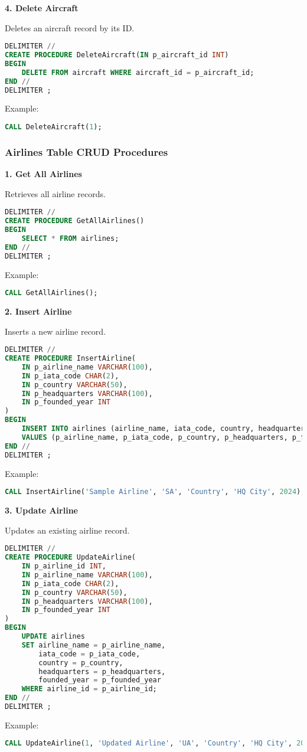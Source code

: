 \documentclass[a4paper,12pt]{article}
\begin{document}
\textbf{4. Delete Aircraft}

Deletes an aircraft record by its ID.
\begin{lstlisting}[language=SQL, caption=DeleteAircraft Stored Procedure]
DELIMITER //
CREATE PROCEDURE DeleteAircraft(IN p_aircraft_id INT)
BEGIN
    DELETE FROM aircraft WHERE aircraft_id = p_aircraft_id;
END //
DELIMITER ;
\end{lstlisting}
Example:
\begin{lstlisting}[language=SQL]
CALL DeleteAircraft(1);
\end{lstlisting}

\subsubsection{Airlines Table CRUD Procedures}
\textbf{1. Get All Airlines}

Retrieves all airline records.
\begin{lstlisting}[language=SQL, caption=GetAllAirlines Stored Procedure]
DELIMITER //
CREATE PROCEDURE GetAllAirlines()
BEGIN
    SELECT * FROM airlines;
END //
DELIMITER ;
\end{lstlisting}
Example:
\begin{lstlisting}[language=SQL]
CALL GetAllAirlines();
\end{lstlisting}

\textbf{2. Insert Airline}

Inserts a new airline record.
\begin{lstlisting}[language=SQL, caption=InsertAirline Stored Procedure]
DELIMITER //
CREATE PROCEDURE InsertAirline(
    IN p_airline_name VARCHAR(100),
    IN p_iata_code CHAR(2),
    IN p_country VARCHAR(50),
    IN p_headquarters VARCHAR(100),
    IN p_founded_year INT
)
BEGIN
    INSERT INTO airlines (airline_name, iata_code, country, headquarters, founded_year)
    VALUES (p_airline_name, p_iata_code, p_country, p_headquarters, p_founded_year);
END //
DELIMITER ;
\end{lstlisting}
Example:
\begin{lstlisting}[language=SQL]
CALL InsertAirline('Sample Airline', 'SA', 'Country', 'HQ City', 2024);
\end{lstlisting}

\textbf{3. Update Airline}

Updates an existing airline record.
\begin{lstlisting}[language=SQL, caption=UpdateAirline Stored Procedure]
DELIMITER //
CREATE PROCEDURE UpdateAirline(
    IN p_airline_id INT,
    IN p_airline_name VARCHAR(100),
    IN p_iata_code CHAR(2),
    IN p_country VARCHAR(50),
    IN p_headquarters VARCHAR(100),
    IN p_founded_year INT
)
BEGIN
    UPDATE airlines
    SET airline_name = p_airline_name,
        iata_code = p_iata_code,
        country = p_country,
        headquarters = p_headquarters,
        founded_year = p_founded_year
    WHERE airline_id = p_airline_id;
END //
DELIMITER ;
\end{lstlisting}
Example:
\begin{lstlisting}[language=SQL]
CALL UpdateAirline(1, 'Updated Airline', 'UA', 'Country', 'HQ City', 2025);
\end{lstlisting}
\end{document}
